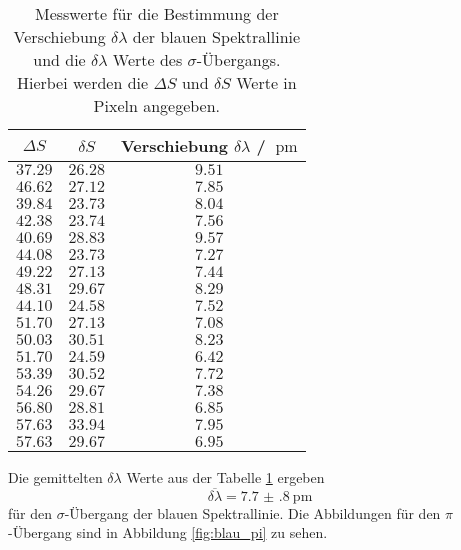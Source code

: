 \begin{table}
    \centering
    \caption{Messwerte für die Bestimmung der Verschiebung $\delta \lambda$ der blauen Spektrallinie und die $\delta\lambda$ Werte des $\sigma$-Übergangs. Hierbei werden die $\Delta S$ und $\delta S$ Werte in Pixeln angegeben.}
    \label{tab:blau_sigma}
    \begin{tabular}{c c c}
        \toprule
        $\Delta S$&$\delta S$&Verschiebung $\delta \lambda$ / $\SI{}{\pico\meter}$\\
        \midrule 
        $\num{37.29}$&$\num{26.28}$&$\num{9.51}$\\
        $\num{46.62}$&$\num{27.12}$&$\num{7.85}$\\
        $\num{39.84}$&$\num{23.73}$&$\num{8.04}$\\
        $\num{42.38}$&$\num{23.74}$&$\num{7.56}$\\
        $\num{40.69}$&$\num{28.83}$&$\num{9.57}$\\
        $\num{44.08}$&$\num{23.73}$&$\num{7.27}$\\
        $\num{49.22}$&$\num{27.13}$&$\num{7.44}$\\
        $\num{48.31}$&$\num{29.67}$&$\num{8.29}$\\
        $\num{44.10}$&$\num{24.58}$&$\num{7.52}$\\
        $\num{51.70}$&$\num{27.13}$&$\num{7.08}$\\
        $\num{50.03}$&$\num{30.51}$&$\num{8.23}$\\
        $\num{51.70}$&$\num{24.59}$&$\num{6.42}$\\
        $\num{53.39}$&$\num{30.52}$&$\num{7.72}$\\
        $\num{54.26}$&$\num{29.67}$&$\num{7.38}$\\
        $\num{56.80}$&$\num{28.81}$&$\num{6.85}$\\
        $\num{57.63}$&$\num{33.94}$&$\num{7.95}$\\
        $\num{57.63}$&$\num{29.67}$&$\num{6.95}$\\
        \bottomrule
    \end{tabular} 
\end{table}
\FloatBarrier
Die gemittelten $\delta \lambda$ Werte aus der Tabelle \ref{tab:blau_sigma} ergeben 
\begin{equation*}
    \overline{\delta\lambda} = \SI{7.7(8)}{\pico\meter}
\end{equation*}
für den $\sigma$-Übergang der blauen Spektrallinie.
Die Abbildungen für den $\pi$-Übergang sind in Abbildung \ref{fig:blau_pi} zu sehen.
